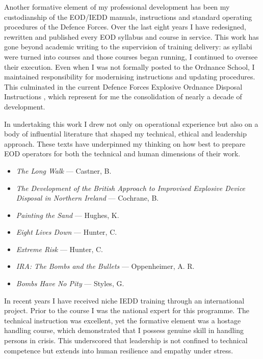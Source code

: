 Another formative element of my professional development has been my custodianship of the EOD/IEDD manuals, instructions and standard operating procedures of the Defence Forces. Over the last eight years I have redesigned, rewritten and published every EOD syllabus and course in service. This work has gone beyond academic writing to the supervision of training delivery: as syllabi were turned into courses and those courses began running, I continued to oversee their execution. Even when I was not formally posted to the Ordnance School, I maintained responsibility for modernising instructions and updating procedures. This culminated in the current Defence Forces Explosive Ordnance Disposal Instructions \parencite{DORD_2022}, which represent for me the consolidation of nearly a decade of development.  

In undertaking this work I drew not only on operational experience but also on a body of influential literature that shaped my technical, ethical and leadership approach. These texts have underpinned my thinking on how best to prepare EOD operators for both the technical and human dimensions of their work.  

\begin{itemize}
	\item \nocite{CASTNER_2014} \textit{The Long Walk} — Castner, B.  
	\item \nocite{COCHRANE_2012} \textit{The Development of the British Approach to Improvised Explosive Device Disposal in Northern Ireland} — Cochrane, B.  
	\item \nocite{HUGHES_2017} \textit{Painting the Sand} — Hughes, K.  
	\item \nocite{HUNTER_2009} \textit{Eight Lives Down} — Hunter, C.  
	\item \nocite{HUNTER_2010} \textit{Extreme Risk} — Hunter, C.  
	\item \nocite{OPPENHEIMER_2009} \textit{IRA: The Bombs and the Bullets} — Oppenheimer, A. R.  
	\item \nocite{STYLES_1975} \textit{Bombs Have No Pity} — Styles, G.  
\end{itemize}  

In recent years I have received niche IEDD training through an international project. Prior to the course I was the national expert for this programme. The technical instruction was excellent, yet the formative element was a hostage handling course, which demonstrated that I possess genuine skill in handling persons in crisis. This underscored that leadership is not confined to technical competence but extends into human resilience and empathy under stress.  

